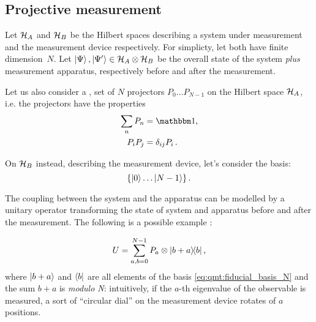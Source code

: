 \subsection{Projective measurement}\label{sec:qmt:projm}

Let $\mathcal{H}_A$ and $\mathcal{H}_B$ be the Hilbert spaces describing
a system under measurement and the measurement device respectively.
For simplicty, let both have finite di\-mension~$N$.
Let $\ket{\Psi}, \ket{\Psi'} \in \mathcal{H}_{A} \otimes \mathcal{H}_{B}$
be the overall state of the
system \emph{plus} measurement apparatus, 
respectively before and after the measurement.

Let us also consider a ,  set of $N$ projectors
$P_0 \dots P_{N-1}$ on the Hilbert space $\mathcal{H}_A$,
i.e. the projectors have the properties
\begin{align}
  \sum_n P_n  &= \idop \text{,}\\
  P_i P_j     &= \delta_{ij}P_i \, \text{.}
\end{align}

On $\mathcal{H}_B$ instead, describing the measurement device, let's consider
the
basis:
\begin{equation}\label{eq:qmt:fiducial_basis_N}
  \left\{\ket{0} \dots \ket{N-1}\right\} \text{.}
\end{equation}

The coupling between the system and the apparatus
can be modelled by
a unitary operator
transforming the state of system and apparatus before and after the measurement.
The following is a possible
example \parencite[sec. 3.1.1 ``Orthogonal Measurements'']{PreskillNotes}:

\begin{equation}\label{eq:unitary_measurement}
  U = \sum_{a, b = 0}^{N-1} P_a \otimes \ketbra{b+a}{b} \text{,}
\end{equation}
where 
$\ket{b+a}$ and $\bra{b}$ are all elements of the basis \eqref{eq:qmt:fiducial_basis_N}
and
the sum $b+a$ is \emph{modulo N}:
intuitively, if the $a$-th eigenvalue of the observable is measured,
a sort of ``circular dial''
on the measurement device rotates of $a$ positions.

